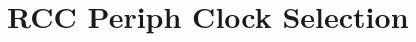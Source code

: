 \hypertarget{group___r_c_c_ex___periph___clock___selection}{}\section{R\+CC Periph Clock Selection}
\label{group___r_c_c_ex___periph___clock___selection}
